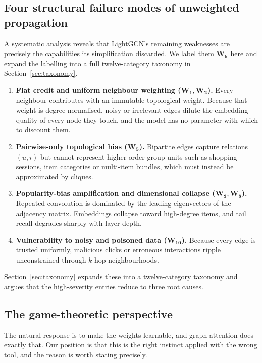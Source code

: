 \documentclass[a4paper,fleqn,longmktitle]{cas-dc}
\begin{document}
\subsection{Four structural failure modes of unweighted propagation}
\label{sec:failuremodes}

A systematic analysis reveals that LightGCN's remaining weaknesses are
precisely the capabilities its simplification discarded. We label them
$\mathbf{W_k}$ here and expand the labelling into a full twelve-category
taxonomy in Section~\ref{sec:taxonomy}.

\begin{enumerate}
\item \textbf{Flat credit and uniform neighbour weighting
($\mathbf{W_1}, \mathbf{W_2}$).} Every neighbour contributes with an immutable
topological weight. Because that weight is degree-normalised, noisy or
irrelevant edges dilute the embedding quality of every node they touch, and
the model has no parameter with which to discount them.

\item \textbf{Pairwise-only topological bias ($\mathbf{W_5}$).} Bipartite
edges capture relations $(u,i)$ but cannot represent higher-order group units
such as shopping sessions, item categories or multi-item bundles, which must
instead be approximated by cliques.

\item \textbf{Popularity-bias amplification and dimensional collapse
($\mathbf{W_3}, \mathbf{W_8}$).} Repeated convolution is dominated by the
leading eigenvectors of the adjacency matrix. Embeddings collapse toward
high-degree items, and tail recall degrades sharply with layer depth.

\item \textbf{Vulnerability to noisy and poisoned data ($\mathbf{W_{10}}$).}
Because every edge is trusted uniformly, malicious clicks or erroneous
interactions ripple unconstrained through $k$-hop neighbourhoods.
\end{enumerate}

Section~\ref{sec:taxonomy} expands these into a twelve-category taxonomy and
argues that the high-severity entries reduce to three root causes.

\subsection{The game-theoretic perspective}
\label{sec:perspective}

The natural response is to make the weights learnable, and graph attention
does exactly that. Our position is that this is the right instinct applied
with the wrong tool, and the reason is worth stating precisely.
\end{document}
